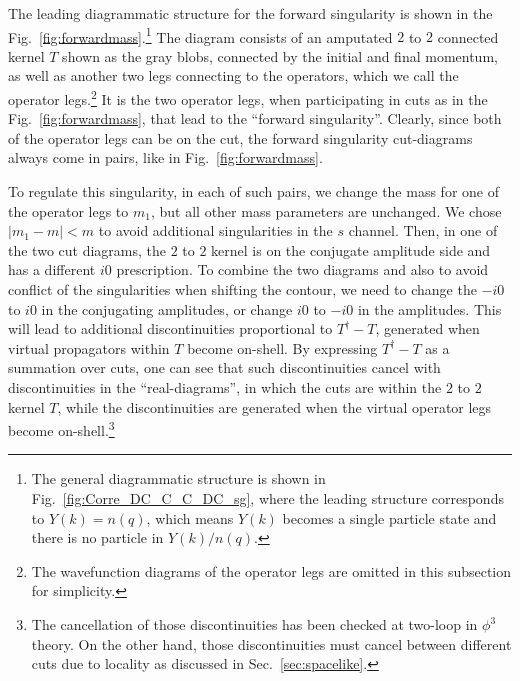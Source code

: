 \documentclass[a4paper,11pt]{article}
\begin{document}
The leading diagrammatic structure for the forward singularity is shown in the Fig.~\ref{fig:forwardmass}.\footnote{The general diagrammatic structure is shown in Fig.~\ref{fig:Corre_DC_C_C_DC_sg}, where the leading structure corresponds to $Y(k)=n(q)$, which means $Y(k)$ becomes a single particle state and there is no particle in $Y(k)/n(q)$.} The diagram consists of an amputated $2$ to $2$ connected kernel $T$ shown as the gray blobs, connected by the initial and final momentum, as well as another two legs connecting to the operators, which we call the operator legs.\footnote{The wavefunction diagrams of the operator legs are omitted in this subsection for simplicity.} It is the two operator legs, when participating in cuts as in the Fig.~\ref{fig:forwardmass}, that lead to the ``forward singularity''.  Clearly, since both of the operator legs can be on the cut, the forward singularity cut-diagrams always come in pairs, like in  Fig.~\ref{fig:forwardmass}.

To regulate this singularity, in each of such pairs, we change the mass for one of the operator legs to $m_1$, but all other mass parameters are unchanged. We chose $|m_1-m|<m$ to avoid additional singularities in the $s$ channel. Then, in one of the two cut diagrams, the $2$ to $2$ kernel is on the conjugate amplitude side and has a different $i0$ prescription. To combine the two diagrams and also to avoid conflict of the singularities when shifting the contour, we need to change the $-i0$ to $i0$ in the conjugating amplitudes, or change $i0$ to $-i0$ in the amplitudes. This will lead to additional discontinuities proportional to $T^{\dagger}-T$, generated when virtual propagators within $T$ become on-shell. By expressing $T^{\dagger}-T$ as a summation over cuts, one can see that such discontinuities cancel with discontinuities in the ``real-diagrams'', in which the cuts are within the $2 $ to $2$ kernel $T$, while the discontinuities are generated when the virtual operator legs become on-shell.\footnote{ The cancellation of those discontinuities has been checked at two-loop in $\phi^3$ theory. On the other hand, those discontinuities must cancel between different cuts due to locality as discussed in Sec.~\ref{sec:spacelike}.}
\end{document}

